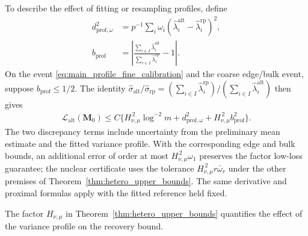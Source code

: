 \documentclass[numsec,webpdf,modern,large,namedate]{oup-authoring-template}
\theoremstyle{plain}
\theoremstyle{remark}
\newcommand{\M}{\bm{M}}
\newif\ifmarkchanges
\newenvironment{revision}{\begingroup\ifmarkchanges\color{red}\fi}{\endgroup}
\begin{document}
\begin{revision}
To describe the effect of fitting or resampling profiles, define
\begin{align}
 d_{\mathrm{prof},\omega}^2
 &=p^{-1}\sum_i\omega_i
     (\widehat\lambda_i^{\mathrm{alt}}-\widehat\lambda_i^{\mathrm{rp}})^2,
       \nonumber\\
 b_{\mathrm{prof}}
 &=\left|\frac{\sum_{i\in I}\widehat\lambda_i^{\mathrm{alt}}}
                  {\sum_{i\in I}\widehat\lambda_i^{\mathrm{rp}}}-1\right|.
 \label{eq:main_profile_discrepancies}
\end{align}
On the event \eqref{eq:main_profile_fine_calibration} and the coarse
edge/bulk event, suppose $b_{\mathrm{prof}}\le1/2$. The identity
$\widehat\sigma_{\mathrm{alt}}/\widehat\sigma_{\mathrm{rp}}=
(\sum_{i\in I}\widehat\lambda_i^{\mathrm{rp}})/
(\sum_{i\in I}\widehat\lambda_i^{\mathrm{alt}})$ then gives
\begin{align*}
 \mathcal L_{\mathrm{alt}}(\M_0)
 \le C\{H_{\nu,\mu}^{\,2}\log^{-2}m+
       d_{\mathrm{prof},\omega}^2+
       H_{\nu,\mu}^{\,2}b_{\mathrm{prof}}^2\}.
\end{align*}
The two discrepancy terms include uncertainty from the preliminary mean
estimate and the fitted variance profile. With the corresponding edge and
bulk bounds, an additional error of order at most
$H_{\nu,\mu}^{\,2}\omega_1$ preserves the factor low-loss guarantee;
the nuclear certificate uses the tolerance
$H_{\nu,\mu}^{\,2}r\bar\omega_r$ under the other premises of
Theorem~\ref{thm:hetero_upper_bounds}. The same derivative and proximal
formulas apply with the fitted reference held fixed.

The factor $H_{\nu,\mu}$ in Theorem~\ref{thm:hetero_upper_bounds}
quantifies the effect of the variance profile on the recovery bound.


\end{revision}
\end{document}
